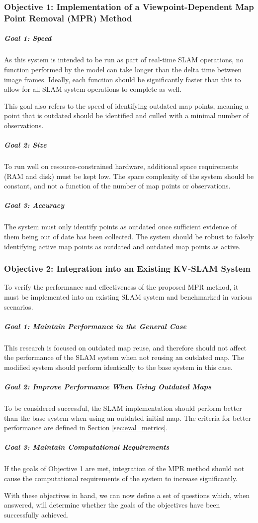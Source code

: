 \subsubsection*{Objective 1: Implementation of a Viewpoint-Dependent Map Point Removal (MPR) Method}
\label{sec:objective_1}
\subparagraph{Goal 1: Speed}

As this system is intended to be run as part of real-time SLAM operations, no function performed by the model can take longer than the delta time between image frames. Ideally, each function should be significantly faster than this to allow for all SLAM system operations to complete as well.

This goal also refers to the speed of identifying outdated map points, meaning a point that is outdated should be identified and culled with a minimal number of observations.

\subparagraph{Goal 2: Size}

To run well on resource-constrained hardware, additional space requirements (RAM and disk) must be kept low. The space complexity of the system should be constant, and not a function of the number of map points or observations.

\subparagraph{Goal 3: Accuracy}

The system must only identify points as outdated once sufficient evidence of them being out of date has been collected. The system should be robust to falsely identifying active map points as outdated and outdated map points as active.

\subsubsection*{Objective 2: Integration into an Existing KV-SLAM System}

To verify the performance and effectiveness of the proposed MPR method, it must be implemented into an existing SLAM system and benchmarked in various scenarios.

\subparagraph{Goal 1: Maintain Performance in the General Case}

This research is focused on outdated map reuse, and therefore should not affect the performance of the SLAM system when not reusing an outdated map. The modified system should perform identically to the base system in this case.

\subparagraph{Goal 2: Improve Performance When Using Outdated Maps}

To be considered successful, the SLAM implementation should perform better than the base system when using an outdated initial map. The criteria for better performance are defined in Section \ref{sec:eval_metrics}.

\subparagraph{Goal 3: Maintain Computational Requirements}

If the goals of Objective 1 are met, integration of the MPR method should not cause the computational requirements of the system to increase significantly.

\bigskip
\noindent With these objectives in hand, we can now define a set of questions which, when answered, will determine whether the goals of the objectives have been successfully achieved.
